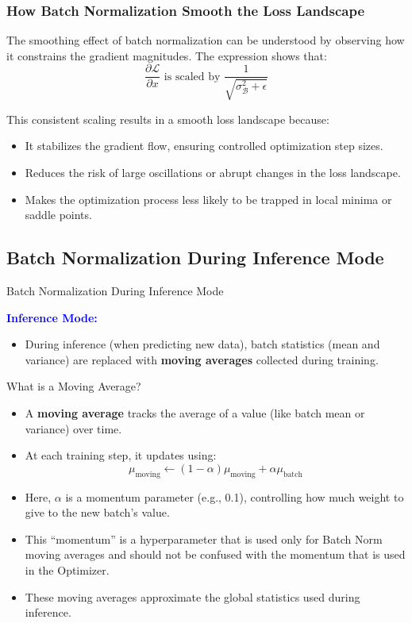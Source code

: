 \documentclass[serif, aspectratio=169]{beamer}
\begin{document}
\begin{frame}
    \frametitle{How Batch Normalization Smooth the  Loss Landscape}

    The smoothing effect of batch normalization can be understood by observing how it constrains the gradient magnitudes. The expression shows that:
    \begin{equation}
        \frac{\partial \mathcal{L}}{\partial x} \text{ is scaled by } \frac{1}{\sqrt{\sigma_{\mathcal{B}}^2 + \epsilon}}
    \end{equation}

    This consistent scaling results in a smooth loss landscape because:
    \begin{itemize}
        \item It stabilizes the gradient flow, ensuring controlled optimization step sizes.
        \item Reduces the risk of large oscillations or abrupt changes in the loss landscape.
        \item Makes the optimization process less likely to be trapped in local minima or saddle points.
    \end{itemize}
\end{frame}

\subsection{Batch Normalization During Inference Mode}

\begin{frame}{Batch Normalization During Inference Mode}
	
	\textcolor{blue}{\textbf{Inference Mode:}}
	
	\begin{itemize}
		
		\item During inference (when predicting new data), batch statistics (mean and variance) are replaced with \textbf{moving averages} collected during training.
		
	\end{itemize}
\end{frame}

\begin{frame}{What is a Moving Average?}
	\begin{itemize}
		\item A \textbf{moving average} tracks the average of a value (like batch mean or variance) over time.
		\item At each training step, it updates using:
		\[
		\mu_{\text{moving}} \leftarrow (1 - \alpha)\mu_{\text{moving}} + \alpha\mu_{\text{batch}}
		\]
		\item Here, $\alpha$ is a momentum parameter (e.g., 0.1), controlling how much weight to give to the new batch's value.
		\item This ``momentum'' is a hyperparameter that is used only for Batch Norm moving averages and should not be confused with the momentum that is used in the Optimizer.
		\item These moving averages approximate the global statistics used during inference.
	\end{itemize}
\end{frame}
\end{document}
